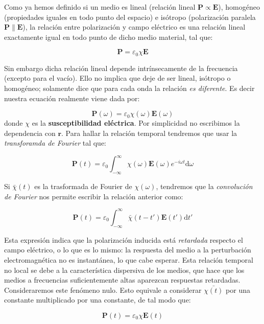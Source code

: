 \documentclass[12pt,a4paper]{article}
\newcommand{\D}{\mathrm{d}}
\newcommand{\En}{\mathbf{E}}
\newcommand{\rn}{\mathbf{r}}
\newcommand{\Pn}{\mathbf{P}}
\numberwithin{equation}{section}
\numberwithin{figure}{section}
\begin{document}
Como ya hemos definido si un medio es lineal (relación lineal $\Pn \propto \En$), homogéneo (propiedades iguales en todo punto del espacio) e isótropo (polarización paralela  $\Pn \parallel \En$), la relación entre polarización y campo eléctrico es una relación lineal exactamente igual en todo punto de dicho medio material, tal que:

\begin{equation}
\Pn =  \varepsilon_0 \chi \En
\end{equation}

Sin embargo dicha relación lineal depende intrínsecamente de la frecuencia (excepto para el vacío). Ello no implica que deje de ser lineal, isótropo o homogéneo; solamente dice que para cada onda la relación \textit{es diferente}. Es decir nuestra ecuación realmente viene dada por:

\begin{equation}
\Pn (\omega) = \varepsilon_0 \chi (\omega) \En (\omega)
\end{equation}
donde $\chi$ es la \textbf{susceptibilidad eléctrica}. Por simplicidad no escribimos la dependencia con $\rn$. Para hallar la relación temporal tendremos que usar la \textit{transforamda de Fourier} tal que:

\begin{equation}
\Pn (t) = \varepsilon_0 \int_{-\infty}^\infty \chi (\omega) \En (\omega) e^{-i \omega t} \D \omega
\end{equation}

Si $\bar{\chi} (t)$ es la trasformada de Fourier de $\chi (\omega)$, tendremos que la \textit{convolución de Fourier} nos permite escribir la relación anterior como:

\begin{equation}
\Pn (t) = \varepsilon_0 \int_{-\infty}^{\infty} \bar{\chi} (t-t') \En (t') \D t'
\end{equation}

Esta expresión indica que la polarización inducida está \textit{retardada} respecto el campo eléctrico, o lo que es lo mismo: la respuesta del medio a la perturbación electromagnética no es instantánea, lo que cabe esperar. Esta relación temporal no local se debe a la característica dispersiva de los medios, que hace que los medios a frecuencias suficientemente altas aparezcan respuestas retardadas. Consideraremos este fenómeno nulo. Esto equivale a considerar $\bar{\chi(t)}$ por una constante multiplicado por una constante, de tal modo que:


\begin{equation}
\Pn (t) =  \varepsilon_0 \chi \En (t)
\end{equation}
\end{document}
